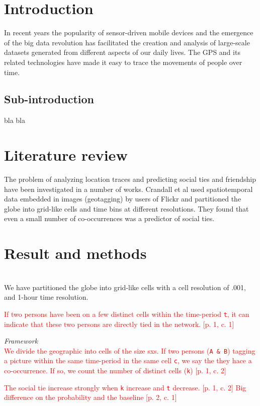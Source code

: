 \section{Introduction}
In recent years the popularity of sensor-driven mobile devices and the emergence of the big data revolution has facilitated the creation and analysis of large-scale datasets generated from different aspects of our daily lives\cite{lazer2009life}. The GPS and its related technologies have made it easy to trace the movements of people over time.

\subsection{Sub-introduction}
bla bla


\section{Literature review}
The problem of analyzing location traces and predicting social ties and friendship have been investigated in a number of works. Crandall et al\cite{ISTfGC} used spatiotemporal data embedded in images (geotagging) by users of Flickr and partitioned the globe into grid-like cells and time bins at different resolutions. They found that even a small number of co-occurrences was a predictor of social ties.



\section{Result and methods}\\
We have partitioned the globe into grid-like cells with a cell resolution of .001\degree, and 1-hour time resolution. 

\textcolor{red}{If two persons have been on a few distinct cells within the time-period \texttt{t}, it can indicate that these two persons are directly tied in the network. [p. 1, c. 1]}

\textit{Framework}\\
\textcolor{red}{We divide the geographic into cells of the size sxs. 
If two persons (\texttt{A \& B}) tagging a picture within the same time-period in the same cell \texttt{c}, we say the they hace a co-occurrence. If so, we count the number of distinct cells (\texttt{k}) [p. 1, c. 2]}


\textcolor{red}{The social tie increase strongly when \texttt{k} increase and \texttt{t} decrease. [p. 1, c. 2]
Big difference on the probability and the baseline [p. 2, c. 1]}

